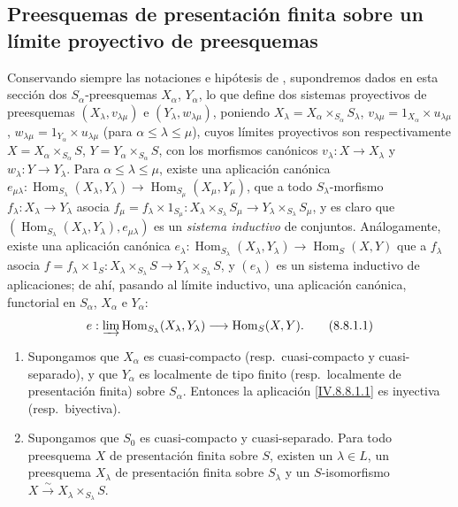 \subsection{Preesquemas de presentación finita sobre un límite proyectivo de preesquemas}
\label{subsection:IV.8.8}

\begin{env}[8.8.1]
\label{IV.8.8.1}
Conservando siempre las notaciones e hipótesis de , supondremos dados en esta sección dos $S_\alpha$-preesquemas $X_\alpha$, $Y_\alpha$, lo que define  dos sistemas proyectivos de preesquemas $(X_\lambda,v_{\lambda\mu})$ e $(Y_\lambda,w_{\lambda\mu})$, poniendo $X_\lambda=X_\alpha\times_{S_\alpha}S_\lambda$, $v_{\lambda\mu}=1_{X_\alpha}\times u_{\lambda\mu}$, $w_{\lambda\mu}=1_{Y_\alpha}\times u_{\lambda\mu}$ (para $\alpha\leqslant\lambda\leqslant\mu$), cuyos límites proyectivos son respectivamente $X=X_\alpha\times_{S_\alpha}S$, $Y=Y_\alpha\times_{S_\alpha}S$, con los morfismos canónicos $v_\lambda:X\to X_\lambda$ y $w_\lambda:Y\to Y_\lambda$.
Para $\alpha\leqslant\lambda\leqslant\mu$, existe una aplicación canónica $e_{\mu\lambda}:\operatorname{Hom}_{S_\lambda}(X_\lambda,Y_\lambda)\to\operatorname{Hom}_{S_\mu}(X_\mu,Y_\mu)$, que a todo $S_\lambda$-morfismo $f_\lambda:X_\lambda\to Y_\lambda$ asocia $f_\mu=f_\lambda\times 1_{S_\mu}:X_\lambda\times_{S_\lambda}S_\mu\to Y_\lambda\times_{S_\lambda}S_\mu$, y es claro que $(\operatorname{Hom}_{S_\lambda}(X_\lambda,Y_\lambda),e_{\mu\lambda})$ es un \emph{sistema inductivo} de conjuntos.
Análogamente, existe una aplicación canónica $e_\lambda:\operatorname{Hom}_{S_\lambda}(X_\lambda,Y_\lambda)\to\operatorname{Hom}_S(X,Y)$ que a $f_\lambda$ asocia $f=f_\lambda\times 1_S:X_\lambda\times_{S_\lambda}S\to Y_\lambda\times_{S_\lambda}S$, y $(e_\lambda)$ es un sistema inductivo de aplicaciones; de ahí, pasando al límite inductivo, una aplicación canónica, functorial en $S_\alpha$, $X_\alpha$ e $Y_\alpha$:
\[
  e:\varinjlim\operatorname{Hom}_{S_\lambda}(X_\lambda,Y_\lambda)\to\operatorname{Hom}_S(X,Y).
  \tag{8.8.1.1}\label{IV.8.8.1.1}
\]
\end{env}

\begin{theorem}[8.8.2]
\label{IV.8.8.2}
\begin{enumerate}[label=(\roman*)]
\item Supongamos que $X_\alpha$ es cuasi-compacto (resp.\ cuasi-compacto y cuasi-separado), y que $Y_\alpha$ es localmente de tipo finito (resp.\ localmente de presentación finita) sobre $S_\alpha$.
Entonces la aplicación \eqref{IV.8.8.1.1} es inyectiva (resp.\ biyectiva).
\item Supongamos que $S_0$ es cuasi-compacto y cuasi-separado.
Para todo preesquema $X$ de presentación finita sobre $S$, existen un $\lambda\in L$, un preesquema $X_\lambda$ de presentación finita sobre $S_\lambda$ y un $S$-isomorfismo $X\xrightarrow{\sim}X_\lambda\times_{S_\lambda}S$.
\end{enumerate}
\end{theorem}

